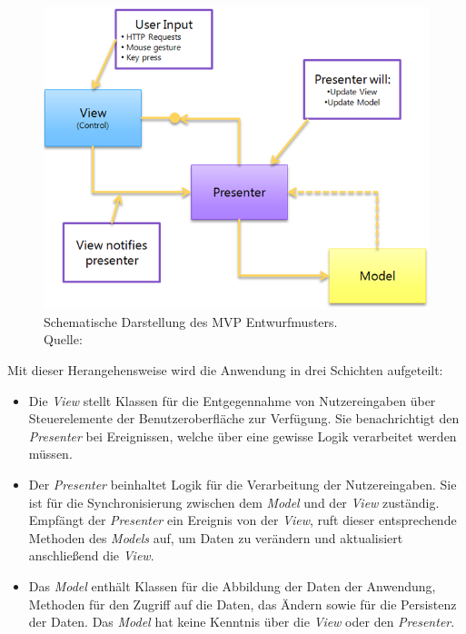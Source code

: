 \begin{figure}[H]
	\centering
	\includegraphics[width=1.0\textwidth]{resources/conception/mvp_pattern.png}
	\caption{Schematische Darstellung des MVP Entwurfmusters. \\Quelle: \cite{Valk2009}}
	\label{img:mvp_pattern}
\end{figure}

Mit dieser Herangehensweise wird die Anwendung in drei Schichten aufgeteilt:

\begin{itemize}
	\item{Die \textit{View} stellt Klassen für die Entgegennahme von Nutzereingaben über Steuerelemente der Benutzeroberfläche zur Verfügung. Sie benachrichtigt den \textit{Presenter} bei Ereignissen, welche über eine gewisse Logik verarbeitet werden müssen.}
	\item{Der \textit{Presenter} beinhaltet Logik für die Verarbeitung der Nutzereingaben. Sie ist für die Synchronisierung zwischen dem \textit{Model} und der \textit{View} zuständig. Empfängt der \textit{Presenter} ein Ereignis von der \textit{View}, ruft dieser entsprechende Methoden des \textit{Models} auf, um Daten zu verändern und aktualisiert anschließend die \textit{View}.}
	\item{Das \textit{Model} enthält Klassen für die Abbildung der Daten der Anwendung, Methoden für den Zugriff auf die Daten, das Ändern sowie für die Persistenz der Daten. Das \textit{Model} hat keine Kenntnis über die \textit{View} oder den \textit{Presenter}}.
\end{itemize}


